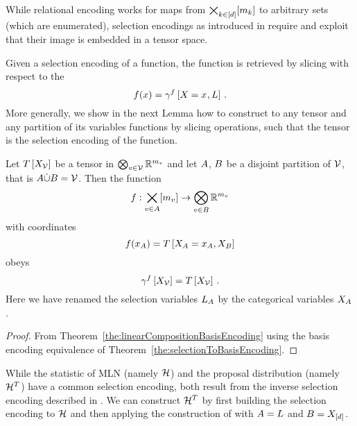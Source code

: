 

While relational encoding works for maps from $\bigtimes_{k\in[d]}[m_{k}]$ to arbitrary sets (which are enumerated), selection encodings as introduced in  require and exploit that their image is embedded in a tensor space.

Given a selection encoding of a function, the function is retrieved by slicing with respect to the
\[ f(x) = \gamma^{f}\left[X_{}=x_{},L\right] \, . \]
More generally, we show in the next Lemma how to construct to any tensor and any partition of its variables functions by slicing operations, such that the tensor is the selection encoding of the function.

\begin{lemma}
    \label{lem:inverseSelectionEncoding} %
    Let $T\left[X_{\mathcal{V}}\right]$ be a tensor in $\bigotimes_{v\in\mathcal{V}}\mathbb{R}^{m_{v}}$ and let $A$, $B$ be a disjoint partition of $\mathcal{V}$, that is $A\dot{\cup}B=\mathcal{V}$.
    Then the function
    \[ f : \bigtimes_{v\in A}[m_{v}] \rightarrow \bigotimes_{v\in B} \mathbb{R}^{m_{v}}  \]
    with coordinates
    \[ f(x_{A}) = T\left[X_{A}=x_{A},X_{B}\right]  \]
    obeys
    \[ \gamma^{f}\left[X_{\mathcal{V}}\right] = T\left[X_{\mathcal{V}}\right] \, . \]
    Here we have renamed the selection variables $L_{A}$ by the categorical variables $X_{A}$.
\end{lemma}
\begin{proof}
    From Theorem~\ref{the:linearCompositionBasisEncoding} using the basis encoding equivalence of Theorem~\ref{the:selectionToBasisEncoding}.
\end{proof}


\begin{example}
    While the statistic of MLN (namely $\mathcal{H}$) and the proposal distribution (namely $\mathcal{H}^T$) have a common selection encoding, both result from the inverse selection encoding described in .
    We can construct $\mathcal{H}^T$ by first building the selection encoding to $\mathcal{H}$ and then applying the construction of  with $A=L$ and $B=X_{[d]}$.
\end{example}


